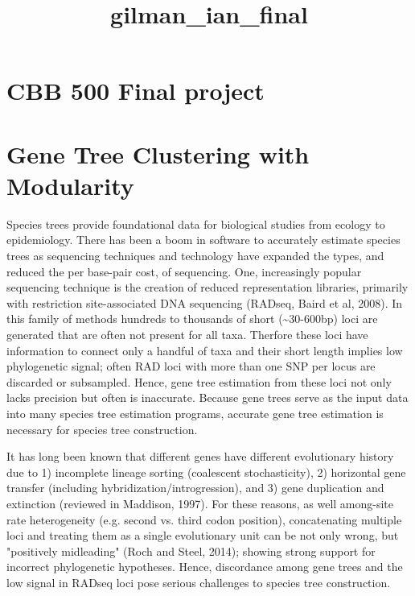 \documentclass[11pt]{article}
\title{gilman\_ian\_final}
\begin{document}
    
    
    \maketitle
    
    

    
    \section{CBB 500 Final project}\label{cbb-500-final-project}

\section{Gene Tree Clustering with
Modularity}\label{gene-tree-clustering-with-modularity}

Species trees provide foundational data for biological studies from
ecology to epidemiology. There has been a boom in software to accurately
estimate species trees as sequencing techniques and technology have
expanded the types, and reduced the per base-pair cost, of sequencing.
One, increasingly popular sequencing technique is the creation of
reduced representation libraries, primarily with restriction
site-associated DNA sequencing (RADseq, Baird et al, 2008). In this
family of methods hundreds to thousands of short
(\textasciitilde{}30-600bp) loci are generated that are often not
present for all taxa. Therfore these loci have information to connect
only a handful of taxa and their short length implies low phylogenetic
signal; often RAD loci with more than one SNP per locus are discarded or
subsampled. Hence, gene tree estimation from these loci not only lacks
precision but often is inaccurate. Because gene trees serve as the input
data into many species tree estimation programs, accurate gene tree
estimation is necessary for species tree construction.

It has long been known that different genes have different evolutionary
history due to 1) incomplete lineage sorting (coalescent stochasticity),
2) horizontal gene transfer (including hybridization/introgression), and
3) gene duplication and extinction (reviewed in Maddison, 1997). For
these reasons, as well among-site rate heterogeneity (e.g. second vs.
third codon position), concatenating multiple loci and treating them as
a single evolutionary unit can be not only wrong, but "positively
midleading" (Roch and Steel, 2014); showing strong support for incorrect
phylogenetic hypotheses. Hence, discordance among gene trees and the low
signal in RADseq loci pose serious challenges to species tree
construction.
\end{document}
